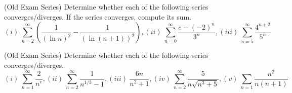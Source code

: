 \documentclass[12pt, a4paper]{article}
\begin{document}
\vspace{-2.25in}
\begin{ex}
  (Old Exam Series) Determine whether each of the following series
  converges/diverges. If the series converges, compute its sum.\[
    (i)\ \sum_{n=2}^\infty \left( \frac{1}{(\ln n)^2} -
      \frac{1}{(\ln(n+1))^2} \right), (ii)\ \sum_{n=0}^\infty
    \frac{e-(-2)^n}{3^n}, (iii)\ \sum_{n=5}^\infty \frac{4^{n+2}}{5^n}
  \]
\end{ex}
\vspace{-2.5in}
\begin{ex}
  (Old Exam Series) Determine whether each of the following series
  converges/diverges. \[
    (i)\ \sum_{n=1}^\infty \frac{2}{n^e}, (ii)\ \sum_{n=2}^\infty
    \frac{1}{n^{1/3}-1}, (iii)\ \frac{6n}{n^2+1}, (iv)\
    \sum_{n=2}^\infty \frac{5}{n\sqrt{n^3+5}}, (v)\ \sum_{n=1} \frac{n^2}{n(n+1)}
  \]
\end{ex}
\end{document}
